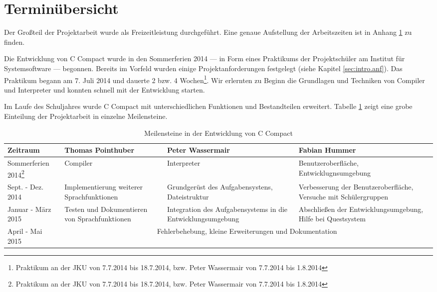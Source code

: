 \section{Terminübersicht}

Der Großteil der Projektarbeit wurde als Freizeitleistung durchgeführt. Eine genaue Aufstellung der Arbeitszeiten ist in Anhang \ref{} zu finden.

Die Entwicklung von C Compact wurde in den Sommerferien 2014 --- in Form eines Praktikums der Projektschüler am Institut für Systemsoftware --- begonnen. Bereits im Vorfeld wurden einige Projektanforderungen festgelegt (siehe Kapitel \ref{sec:intro.anf}). Das Praktikum begann am 7. Juli 2014 und dauerte 2 bzw. 4 Wochen\footnote{Praktikum an der JKU von 7.7.2014 bis 18.7.2014, bzw. Peter Wassermair von 7.7.2014 bis 1.8.2014}. Wir erlernten zu Beginn die Grundlagen und Techniken von Compiler und Interpreter und konnten schnell mit der Entwicklung starten.

Im Laufe des Schuljahres wurde C Compact mit unterschiedlichen Funktionen und Bestandteilen erweitert. Tabelle \ref{tab:intro-milestones} zeigt eine grobe Einteilung der Projektarbeit in einzelne Meilensteine.

\begin{table}[h!]
\def\arraystretch{1.6}
\begin{tabularx}{\columnwidth}{|l|XXX|}
\hline
  \textbf{Zeitraum}&\textbf{Thomas Pointhuber}&\textbf{Peter Wassermair}&\textbf{Fabian Hummer}\\
  \hline
  Sommerferien 2014\footnote{Praktikum an der JKU von 7.7.2014 bis 18.7.2014, bzw. Peter Wassermair von 7.7.2014 bis 1.8.2014} & Compiler & Interpreter & Benutzeroberfläche, Entwicklugnsumgebung \\
  Sept. - Dez. 2014 & Implementierung weiterer Sprachfunktionen & Grundgerüst des Aufgabensystens, Dateistruktur & Verbesserung der Benutzeroberfläche, Versuche mit Schülergruppen \\
  Januar - März 2015 & Testen und Dokumentieren von Sprachfunktionen & Integration des Aufgabensystems in die Entwicklungsumgebung & Abschließen der Entwicklungsumgebung, Hilfe bei Questsystem\\
  April - Mai 2015 & \multicolumn{3}{c}{Fehlerbehebung, kleine Erweiterungen und Dokumentation}\\
  \hline
\end{tabularx}
\caption{Meilensteine in der Entwicklung von C Compact}
\label{tab:intro-milestones}
\end{table}


